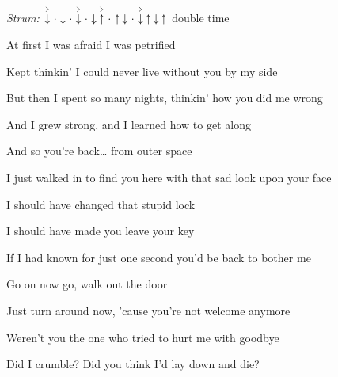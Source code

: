 \begin{song}


\begin{headerbox}
\RaiseBoxWithAccents
\textit{Strum:} $\AccentDown\Miss\Down\Miss\AccentDown\Miss\Down\AccentUp \Miss\Up\Down\Miss\AccentDown\Up\Down\Up$ double time
\end{headerbox}

\begin{hchordbox}
\end{hchordbox}

\Large

\bigskip

 \par
\smallskip
At first I was afraid I was petrified \par
Kept thinkin' I could never live without you by my side \par
But then I spent so many nights, thinkin' how you did me wrong \par
And I grew strong, and I learned how to get along \par

\bigskip

And so you're back… from outer space \par
I just walked in to find you here with that sad look upon your face \par
I should have changed that stupid lock \par
I should have made you leave your key \par
If I had known for just one second you'd be back to bother me \par

\bigskip

\begin{chorusboxwide}{\PrechorusAndChorus}
Go on now go, walk out the door \par
Just turn around now, 'cause you're not welcome anymore \par
{} Weren't you the one who tried to hurt me with goodbye \par
Did I crumble? Did you think I'd lay down and die? \par


\end{chorusboxwide}
\end{song}

